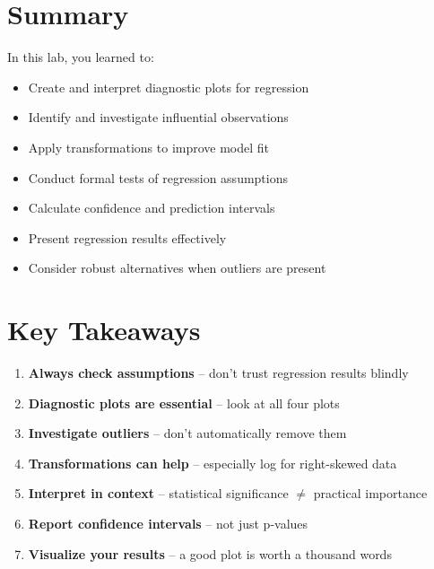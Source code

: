 \documentclass[11pt]{article}
\begin{document}
\section*{Summary}

In this lab, you learned to:
\begin{itemize}
\item Create and interpret diagnostic plots for regression
\item Identify and investigate influential observations
\item Apply transformations to improve model fit
\item Conduct formal tests of regression assumptions
\item Calculate confidence and prediction intervals
\item Present regression results effectively
\item Consider robust alternatives when outliers are present
\end{itemize}

\section*{Key Takeaways}
\begin{enumerate}
\item \textbf{Always check assumptions} -- don't trust regression results blindly
\item \textbf{Diagnostic plots are essential} -- look at all four plots
\item \textbf{Investigate outliers} -- don't automatically remove them
\item \textbf{Transformations can help} -- especially log for right-skewed data
\item \textbf{Interpret in context} -- statistical significance $\neq$ practical importance
\item \textbf{Report confidence intervals} -- not just p-values
\item \textbf{Visualize your results} -- a good plot is worth a thousand words
\end{enumerate}


\begin{itemize}
\end{itemize}
\end{document}
